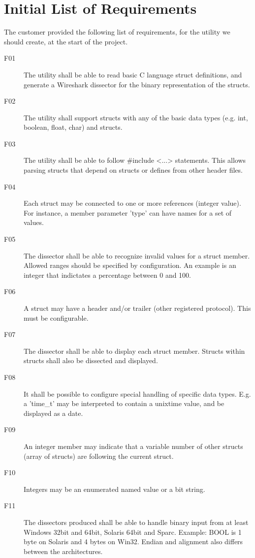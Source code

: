 \chapter{Initial List of Requirements}
\label{app:initreqs}

The customer provided the following list of requirements, for the utility
we should create, at the start of the project.
\begin{description}
	\item[F01] The utility shall be able to read basic C language struct
		definitions, and generate a Wireshark dissector for the binary
		representation of the structs.
	\item[F02] The utility shall support structs with any of the basic data
		types (e.g. int, boolean, float, char) and structs.
	\item[F03] The utility shall be able to follow \#include <...> statements.
		This allows parsing structs that depend on structs or defines from
		other header files.
	\item[F04] Each struct may be connected to one or more references (integer value).
		For instance, a member parameter 'type' can have names for a set of values.
	\item[F05] The dissector shall be able to recognize invalid values for a
		struct member. Allowed ranges should be specified by configuration. An
		example is an integer that indictates a percentage between 0 and 100.
	\item[F06] A struct may have a header and/or trailer (other registered
		protocol). This must be configurable.
	\item[F07] The dissector shall be able to display each struct member.
		Structs within structs shall also be dissected and displayed.
	\item[F08] It shall be possible to configure special handling of specific
		data types. E.g. a 'time\_t' may be interpreted to contain a unixtime
		value, and be displayed as a date.
	\item[F09] An integer member may indicate that a variable number of other
		structs (array of structs) are following the current struct.
	\item[F10] Integers may be an enumerated named value or a bit string.
	\item[F11] The dissectors produced shall be able to handle binary input
		from at least Windows 32bit and 64bit, Solaris 64bit and Sparc.
		Example: BOOL is 1 byte on Solaris and 4 bytes on Win32. Endian and
		alignment also differs between the architectures.
\end{description}

